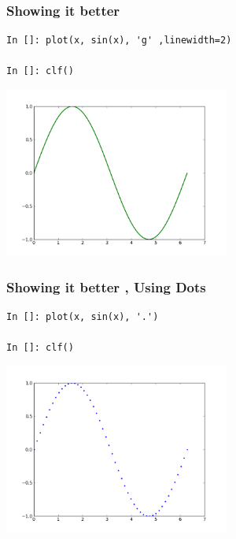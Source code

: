 \documentclass[14pt,compress]{beamer}
\newcounter{time}
\newcommand{\inctime}[1]{\addtocounter{time}{#1}{\tiny \thetime\ m}}
\begin{document}
\begin{frame}[fragile]
\frametitle{Showing it better}
\vspace{-0.15in}
\begin{lstlisting}
In []: plot(x, sin(x), 'g' ,linewidth=2)

In []: clf()

\end{lstlisting}
\vspace*{-0.2in}
\begin{center}
  \includegraphics[height=2.2in, interpolate=true]{data/green}  
\end{center}
\end{frame}


\begin{frame}[fragile]
\frametitle{Showing it better , Using Dots }
\vspace{-0.15in}
\begin{lstlisting}
In []: plot(x, sin(x), '.')

In []: clf()

\end{lstlisting}
\vspace*{-0.2in}
\begin{center}
  \includegraphics[height=2.2in, interpolate=true]{data/dash}  
\end{center}
\end{frame}
\end{document}
